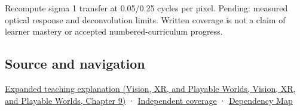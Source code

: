 Recompute sigma 1 transfer at 0.05/0.25 cycles per pixel. Pending: measured optical response and deconvolution limits. Written coverage is not a claim of learner mastery or accepted numbered-curriculum progress.

\subsection{Source and navigation}\label{appendix-8b76b0efd27f-source-and-navigation}

\href{../07-Vision-XR-and-Playable-Worlds/main.pdf\#nameddest=04-visual-computing-ii-ch042-a-footprint-is-more-meaningful-than-an-isolated-pixel-center}{Expanded teaching explanation (Vision, XR, and Playable Worlds, Vision, XR, and Playable Worlds, Chapter 9)} · \hyperref[appendix-fd090d982a15-xr01---independent-seeing-and-representation-source]{Independent coverage} · \hyperref[appendix-4ad47bdd269a]{Dependency Map}
